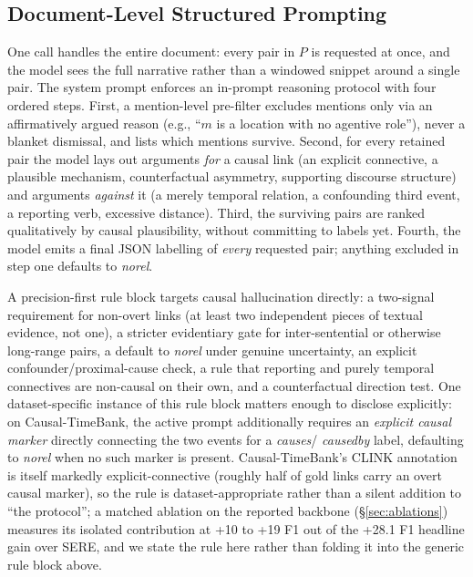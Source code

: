 \documentclass[11pt]{article}
\begin{document}
\subsection{Document-Level Structured Prompting}
\label{sec:docprompt}
One call handles the entire document: every pair in $P$ is requested at once, and
the model sees the full narrative rather than a windowed snippet around a single
pair. The system prompt enforces an in-prompt reasoning protocol with four ordered
steps. First, a mention-level pre-filter excludes mentions only via an
affirmatively argued reason (e.g., ``$m$ is a location with no agentive role''),
never a blanket dismissal, and lists which mentions survive. Second, for every
retained pair the model lays out arguments \emph{for} a causal link (an explicit
connective, a plausible mechanism, counterfactual asymmetry, supporting discourse
structure) and arguments \emph{against} it (a merely temporal relation, a
confounding third event, a reporting verb, excessive distance). Third, the
surviving pairs are ranked qualitatively by causal plausibility, without committing
to labels yet. Fourth, the model emits a final JSON labelling of \emph{every}
requested pair; anything excluded in step one defaults to \textit{norel}.

A precision-first rule block targets causal hallucination directly: a two-signal
requirement for non-overt links (at least two independent pieces of textual
evidence, not one), a stricter evidentiary gate for inter-sentential or otherwise
long-range pairs, a default to \textit{norel} under genuine uncertainty, an
explicit confounder/proximal-cause check, a rule that reporting and purely temporal
connectives are non-causal on their own, and a counterfactual direction test. One
dataset-specific instance of this rule block matters enough to disclose explicitly:
on Causal-TimeBank, the active prompt additionally requires an \emph{explicit
causal marker} directly connecting the two events for a \textit{causes}/
\textit{causedby} label, defaulting to \textit{norel} when no such marker is
present. Causal-TimeBank's CLINK annotation is itself markedly explicit-connective
(roughly half of gold links carry an overt causal marker), so the rule is
dataset-appropriate rather than a silent addition to ``the protocol''; a matched
ablation on the reported backbone (\S\ref{sec:ablations}) measures its isolated
contribution at +10 to +19 F1 out of the +28.1 F1 headline gain over SERE, and we
state the rule here rather than folding it into the generic rule block above.
\end{document}
